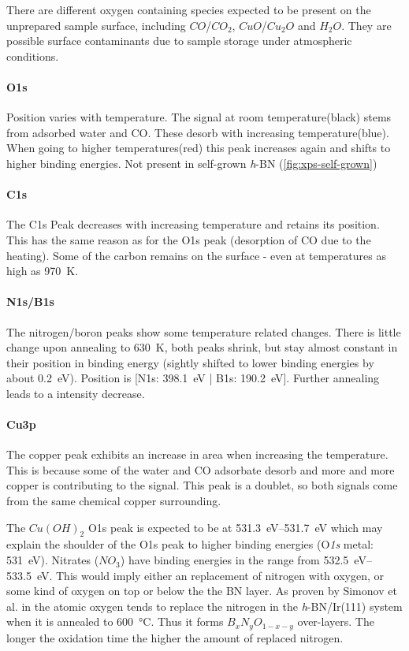 There are different oxygen containing species expected to be present on the unprepared sample surface, including $CO$/$CO_2$, $CuO$/$Cu_2O$ and $H_2O$. They are possible surface contaminants due to sample storage under atmospheric conditions.
\paragraph{O1s}
Position varies with temperature. The signal at room temperature(black) stems from adsorbed water and CO. These desorb with increasing temperature(blue). When going to higher temperatures(red) this peak increases again and shifts to higher binding energies. Not present in self-grown \textit{h}-BN (\autoref{fig:xps-self-grown})

\paragraph{C1s}
The C1s Peak decreases with increasing temperature and retains its position. This has the same  reason as for the O1s peak (desorption of CO due to the heating). Some of the carbon remains on the surface - even at temperatures as high as \SI{970}{\K}.

\paragraph{N1s/B1s}
The nitrogen/boron peaks show some temperature related changes. There is little change upon annealing to \SI{630}{\K}, both peaks shrink, but stay almost constant in their position in binding energy (sightly shifted to lower binding energies by about \SI{0.2}{\eV}). Position is [N1s: \SI{398.1}{\eV} | B1s: \SI{190.2}{\eV}]. Further annealing leads to a intensity decrease.

\paragraph{Cu3p}
The copper peak exhibits an increase in area when increasing the temperature. This is because some of the water and CO adsorbate desorb and more and more copper is contributing to the signal. This peak is a doublet, so both signals come from the same chemical copper surrounding.


The $Cu(OH)_2$ O1s peak is expected to be at \SIrange{531.3}{531.7}{\eV}\cite{deroubaix_x-ray_1992} which may explain the shoulder of the O1s peak to higher binding energies (O\textit{1s} metal: \SI{531}{\eV}). Nitrates ($NO_3$) have binding energies in the range from \SIrange{532.5}{533.5}{\eV}\cite[45]{wanger_handbook_1979}. This would imply either an replacement of nitrogen with oxygen, or some kind of oxygen on top or below the the BN layer. As proven by Simonov et al. in \cite{simonov_controllable_2012} the atomic oxygen tends to replace the nitrogen in the \textit{h}-BN/Ir(111) system when it is annealed to \SI{600}{\degreeCelsius}. Thus it forms $B_{x}N_{y}O_{1-x-y}$ over-layers. The longer the oxidation time the higher the amount of replaced nitrogen. 

